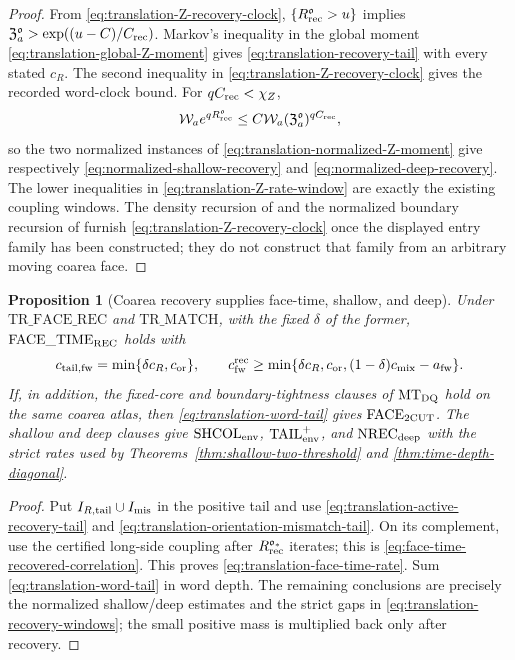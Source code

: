 \documentclass[11pt]{article}
\newtheorem{proposition}[theorem]{Proposition}
\begin{document}
\begin{proof}
From \eqref{eq:translation-Z-recovery-clock},
$\{R_{\rm rec}^{\mathfrak o}>u\}$ implies
$\mathfrak Z_a^{\mathfrak o}>
\exp((u-C)/C_{\rm rec})$.  Markov's inequality in the global moment
\eqref{eq:translation-global-Z-moment} gives
\eqref{eq:translation-recovery-tail} with every stated $c_R$.  The second
inequality in \eqref{eq:translation-Z-recovery-clock} gives the recorded
word-clock bound.  For $qC_{\rm rec}<\chi_Z$,
\[
 \mathcal W_ae^{qR_{\rm rec}^{\mathfrak o}}
 \le C\mathcal W_a
 (\mathfrak Z_a^{\mathfrak o})^{qC_{\rm rec}},
\]
so the two normalized instances of
\eqref{eq:translation-normalized-Z-moment} give respectively
\eqref{eq:normalized-shallow-recovery} and
\eqref{eq:normalized-deep-recovery}.  The lower inequalities in
\eqref{eq:translation-Z-rate-window} are exactly the existing coupling
windows.  The density recursion of \cite[Lemma~13]{SYZ} and the normalized
boundary recursion of \cite[Lemma~16]{SYZ} furnish
\eqref{eq:translation-Z-recovery-clock} once the displayed entry family has
been constructed; they do not construct that family from an arbitrary
moving coarea face.
\end{proof}

\begin{proposition}[Coarea recovery supplies face-time, shallow, and deep]
\label{prop:translation-recovery-closes-three}
Under $\mathrm{TR\_FACE\_REC}$ and $\mathrm{TR\_MATCH}$, with the fixed
$\delta$ of the former,
$\mathrm{FACE\_TIME}_{\rm REC}$ holds with
\begin{equation}
\label{eq:translation-face-time-rate}
 c_{\rm tail,fw}=\min\{\delta c_R,c_{\rm or}\},\qquad
 c_{\rm fw}^{\rm rec}\ge
 \min\{\delta c_R,c_{\rm or},
             (1-\delta)c_{\rm mix}-a_{\rm fw}\}.
\end{equation}
If, in addition, the fixed-core and boundary-tightness clauses of
$\mathrm{MT}_{\rm DQ}$ hold on the same coarea atlas, then
\eqref{eq:translation-word-tail} gives $\mathrm{FACE}_{\rm 2CUT}$.
The shallow and deep clauses give
$\mathrm{SHCOL}_{\rm env}$,
$\mathrm{TAIL}_{\rm env}^{+}$, and $\mathrm{NREC}_{\rm deep}$ with the
strict rates used by Theorems~\ref{thm:shallow-two-threshold} and
\ref{thm:time-depth-diagonal}.
\end{proposition}

\begin{proof}
Put $I_{R,\rm tail}\cup I_{\rm mis}$ in the positive tail and use
\eqref{eq:translation-active-recovery-tail} and
\eqref{eq:translation-orientation-mismatch-tail}.  On its complement, use
the certified long-side coupling after
$R_{\rm rec}^{\mathfrak o_*}$ iterates;
this is
\eqref{eq:face-time-recovered-correlation}.  This proves
\eqref{eq:translation-face-time-rate}.  Sum
\eqref{eq:translation-word-tail} in word depth.  The remaining conclusions
are precisely the normalized shallow/deep estimates and the strict gaps in
\eqref{eq:translation-recovery-windows}; the small positive mass is
multiplied back only after recovery.
\end{proof}
\end{document}
